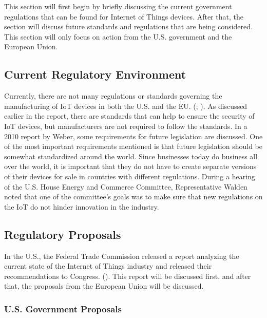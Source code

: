 \documentclass[letterpaper, 12pt]{article}
\begin{document}
\begin{flushleft}
This section will first begin by briefly discussing the current government regulations that can be found for Internet of Things devices. After that,
the section will discuss future standards and regulations that are being considered. This section will only focus on action from the U.S. government and the European Union.

\subsection*{Current Regulatory Environment}

Currently, there are not many regulations or standards governing the manufacturing of IoT devices in both the U.S. and the EU. (\cite{Weber201023}; \cite{housecyberattacks}).  As discussed earlier in the report, there are standards that can help to ensure the security of IoT devices, but manufacturers are
not required to follow the standards. In a 2010 report by Weber, some requirements for future legislation are discussed. One of the most important 
requirements mentioned is that future legislation should be somewhat standardized around the world. Since businesses today do business all over the world,
it is important that they do not have to create separate versions of their devices for sale in countries with different regulations. During a hearing of the
U.S. House Energy and Commerce Committee, Representative Walden noted that one of the committee's goals was to make sure that new regulations on the IoT do not hinder innovation in the industry. 

\subsection*{Regulatory Proposals}

In the U.S., the Federal Trade Commission released a report analyzing the current state of the Internet of Things industry and released their recommendations
to Congress. (\cite{ftc}). This report will be discussed first, and after that, the proposals from the European Union will be discussed.

\subsubsection*{U.S. Government Proposals}


\end{flushleft}
\end{document}
